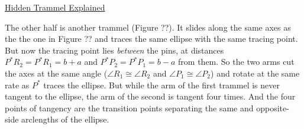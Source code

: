 \documentclass{ximera}
\begin{document}
\begin{onlineOnly}
    \begin{center}
\end{center}
\end{onlineOnly}

\href{https://www.desmos.com/calculator/7rvj2du0mv}{Hidden Trammel Explained}






The other half is another trammel (Figure ??). It slides along the same axes as the the one in Figure ?? and traces the same ellipse with the same tracing point. But now the tracing point lies \emph{between} the pins, at distances $P^* R_2 = P^* R_1 = b+a$ and $P^* P_2 = P^* P_1 = b-a$ from them. So the two arms cut the axes at the same angle ($\angle R_1 \cong\angle R_2$ and $\angle P_1\cong \angle P_2$) and rotate at the same rate as $P^*$ traces the ellipse. But while the arm of the first trammel is never tangent to the ellipse, the arm of the second is tangent four times. And the four points of tangency are the transition points separating the same and opposite-side arclengths of the ellipse.
\end{document}
